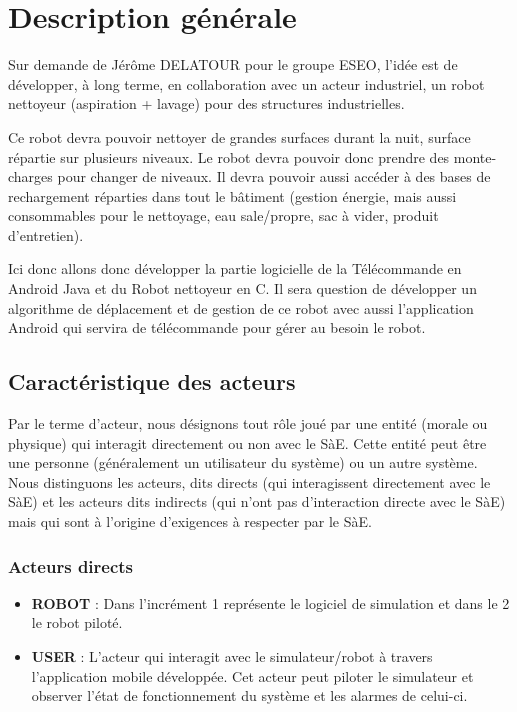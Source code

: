 \section{Description générale}

Sur demande de Jérôme DELATOUR pour le groupe ESEO, l'idée est de développer, à long terme, en collaboration avec un acteur industriel, un robot nettoyeur (aspiration + lavage) pour des structures industrielles.

Ce robot devra pouvoir nettoyer de grandes surfaces durant la nuit, surface répartie sur plusieurs niveaux. Le robot devra pouvoir donc prendre des monte-charges pour changer de niveaux. Il devra pouvoir aussi accéder à des bases de rechargement réparties dans tout le bâtiment (gestion énergie, mais aussi consommables pour le nettoyage, eau sale/propre, sac à vider, produit d'entretien).

Ici donc allons donc développer la partie logicielle de la Télécommande en Android Java et du Robot nettoyeur en C. Il sera question de développer un algorithme de déplacement et de gestion de ce robot avec aussi l'application Android qui servira de télécommande pour gérer au besoin le robot.

\subsection{Caractéristique des acteurs}

Par le terme d'acteur, nous désignons tout rôle joué par une entité (morale ou physique) qui interagit directement ou non avec le SàE. Cette entité peut être une personne (généralement un utilisateur du système) ou un autre système. Nous distinguons les acteurs, dits directs (qui interagissent directement avec le SàE) et les acteurs dits indirects (qui n'ont pas d'interaction directe avec le SàE) mais qui sont à l'origine d'exigences à respecter par le SàE.

\subsubsection{Acteurs directs}

\begin{itemize}
    \item \textbf{ROBOT} : Dans l'incrément 1 représente le logiciel de simulation et dans le 2 le robot piloté.
    \item \textbf{USER} : L'acteur qui interagit avec le simulateur/robot à travers l'application mobile développée. Cet acteur peut piloter le simulateur et observer l'état de fonctionnement du système et les alarmes de celui-ci.
\end{itemize}

